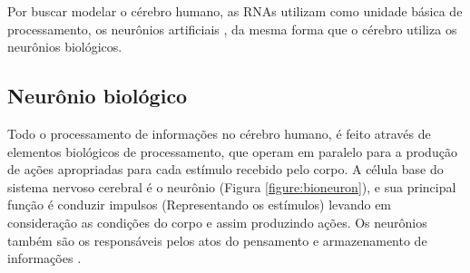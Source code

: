 \par Por buscar modelar o cérebro humano, as RNAs utilizam como unidade básica de processamento, os neurônios artificiais \cite{Haykin2001}, da mesma forma que o cérebro utiliza os neurônios biológicos. %



\subsection{Neurônio biológico}


\par Todo o processamento de informações no cérebro humano, é feito através de elementos biológicos de processamento, que operam em paralelo para a produção de ações apropriadas para cada estímulo recebido pelo corpo. A célula base do sistema nervoso cerebral é o neurônio (Figura \ref{figure:bioneuron}), e sua principal função é conduzir impulsos (Representando os estímulos) levando em consideração as condições do corpo e assim produzindo ações. Os neurônios também são os responsáveis pelos atos do pensamento e armazenamento de informações \cite{livroNunes2016}.

